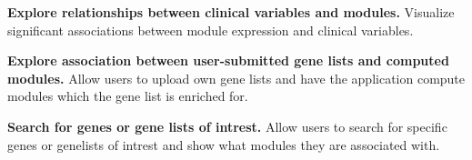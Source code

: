 \textbf{Explore relationships between clinical variables and modules.}
Visualize significant associations between module expression and
clinical variables.

\textbf{Explore association between user-submitted gene lists and computed
modules.} Allow users to upload own gene lists and have the application compute
modules which the gene list is enriched for. 

\textbf{Search for genes or gene lists of intrest.} Allow users to search
for specific genes or genelists of intrest and show what modules they are
associated with. 

\begin{figure}[!t]
\centering
{}
\hfil
{}
\hfil
\centering
{}
\end{figure}
